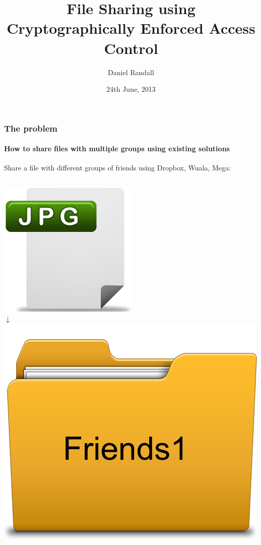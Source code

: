 \documentclass{beamer}
\title{File Sharing using Cryptographically Enforced Access Control}
\author{Daniel Randall}
\institute{Imperial College London}
\date{24th June, 2013}
\begin{document}
\maketitle
  
  \begin{frame}
    \frametitle{The problem}
    \framesubtitle{How to share files with multiple groups using existing solutions}
    Share a file with different groups of friends using Dropbox, Wuala, Mega:
    \begin{columns}[t] %
     \begin{column}[T]{3cm}
     \begin{center}
     \includegraphics[scale=0.2]{images/file/jpgicon.png} \\
     $\boldsymbol{\downarrow}$ \\
     \includegraphics[scale=0.15]{images/folder/friends1}
     \end{center}
     \end{column}
     

\end{columns}
\end{frame}
\end{document}
